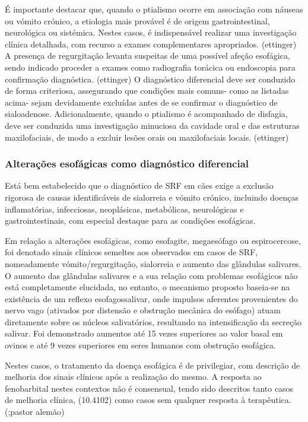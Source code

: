É importante destacar que, quando o ptialismo ocorre em associação com náuseas ou vómito crónico, a etiologia mais provável é de origem gastrointestinal, neurológica ou sistémica. Nestes casos, é indispensável realizar uma investigação clínica detalhada, com recurso a exames complementares apropriados. (ettinger) 
A presença de regurgitação levanta suspeitas de uma possível afeção esofágica, sendo indicado proceder a exames como radiografia torácica ou endoscopia para confirmação diagnóstica. (ettinger)
O diagnóstico diferencial deve ser conduzido de forma criteriosa, assegurando que condições mais comuns- como as listadas acima- sejam devidamente excluídas antes de se confirmar o diagnóstico de sialoadenose.   
Adicionalmente, quando o ptialismo é acompanhado de disfagia, deve ser conduzida uma investigação minuciosa da cavidade oral e das estruturas maxilofaciais, de modo a excluir lesões orais ou maxilofaciais locais. (ettinger) 

\subsubsection{Alterações esofágicas como diagnóstico diferencial}

Está bem estabelecido que o diagnóstico de SRF em cães exige a exclusão rigorosa de causas identificáveis de sialorreia e vómito crónico, incluindo doenças inflamatórias, infecciosas, neoplásicas, metabólicas, neurológicas e gastrointestinais, com especial destaque para as condições esofágicas. 


Em relação a alterações esofágicas, como esofagite, megaesófago ou espirocercose, foi denotado sinais clínicos semel\cite{Han2016}tes aos observados em casos de SRF, nomeadamente vómito/regurgitação, sialorreia e aumento das glândulas salivares. O aumento das glândulas salivares e a sua relação com problemas esofágicos não está completamente elucidada, no entanto, o mecanismo proposto baseia-se na existência de um reflexo esofagossalivar, onde impulsos aferentes provenientes do nervo vago (ativados por distensão e obstrução mecânica do esófago) atuam diretamente sobre os núcleos salivatórios, resultando na intensificação da secreção salivar. Foi demonstrado aumentos até 15 vezes superiores ao valor basal em ovinos e até 9 vezes superiores em seres humanos com obstrução esofágica.


Nestes casos, o tratamento da doença esofágica é de privilegiar, com descrição de melhoria dos sinais clínicos após a realização do mesmo. A resposta ao fenobarbital nestes contextos não é consensual, tendo sido descritos tanto casos de melhoria clínica, (10.4102) como casos sem qualquer resposta à terapêutica. (\cite{10.111};pastor alemão)

